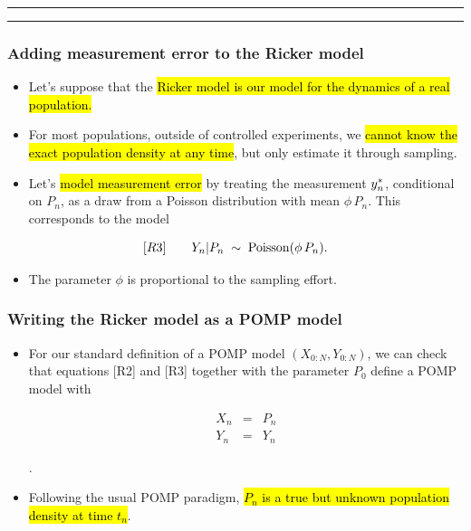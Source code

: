 \documentclass[]{article}
\providecommand{\tightlist}{%
  \setlength{\itemsep}{0pt}\setlength{\parskip}{0pt}}
\begin{document}

\begin{center}\rule{0.5\linewidth}{\linethickness}\end{center}

\begin{center}\rule{0.5\linewidth}{\linethickness}\end{center}

\subsubsection{Adding measurement error to the Ricker
model}\label{adding-measurement-error-to-the-ricker-model}

\begin{itemize}
\item
  Let's suppose that the \hl{Ricker model is our model for the dynamics of a
  real population.}
\item
  For most populations, outside of controlled experiments, we \hl{cannot
  know the exact population density at any time}, but only estimate it
  through sampling.
\item
  Let's \hl{model measurement error} by treating the measurement
  \(y_{n}^*\), conditional on \(P_n\), as a draw from a Poisson
  distribution with mean \(\phi\,P_n\). This corresponds to the model
\end{itemize}

$$[R3] \quad\quad \displaystyle Y_{n}|P_n\;\sim\;\mathrm{Poisson}(\phi\,P_{n}).$$

\begin{itemize}
\tightlist
\item
  The parameter \(\phi\) is proportional to the sampling effort.
\end{itemize}

\subsubsection{Writing the Ricker model as a POMP
model}\label{writing-the-ricker-model-as-a-pomp-model}

\begin{itemize}
\item
  For our standard definition of a POMP model \((X_{0:N},Y_{0:N})\), we
  can check that equations {[}R2{]} and {[}R3{]} together with the
  parameter \(P_0\) define a POMP model with

  \begin{eqnarray}
  X_n &=& P_n \\
  Y_n &=& Y_n 
  \end{eqnarray}

  .
\item
  Following the usual POMP paradigm, \hl{$P_n$ is a true but unknown
  population density at time $t_n$}.
\end{itemize}
\end{document}
